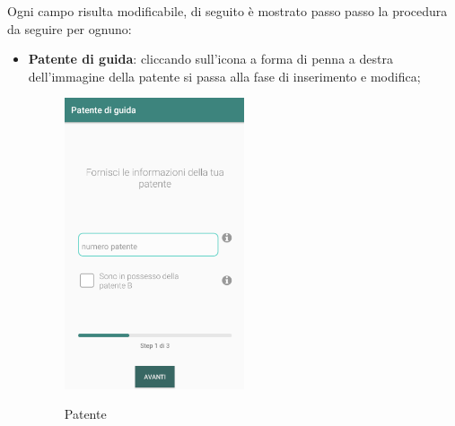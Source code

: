 Ogni campo risulta modificabile, di seguito è mostrato passo passo la procedura da seguire per ognuno:
\begin{itemize}
	\item \textbf{Patente di guida}: cliccando sull'icona a forma di penna a destra dell'immagine della patente si passa alla fase di inserimento e modifica;
	 \begin{figure}[H] 
		\centering 
		\includegraphics[width=0.5\textwidth]{res/images/patente1.png}\\
		\caption{Patente}
		\label{patente}
	\end{figure}
\pagebreak


\end{itemize}
